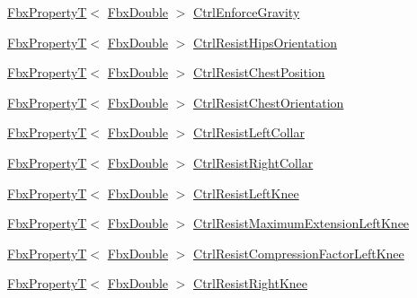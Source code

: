 \begin{DoxyCompactItemize}
\item 
\hyperlink{class_fbx_property_t}{Fbx\+PropertyT}$<$ \hyperlink{fbxtypes_8h_a171e72a1c46fc15c1a6c9c31948c1c5b}{Fbx\+Double} $>$ \hyperlink{class_fbx_character_a45dd614ee3bd42e3324a76f627cd991e}{Ctrl\+Enforce\+Gravity}
\item 
\hyperlink{class_fbx_property_t}{Fbx\+PropertyT}$<$ \hyperlink{fbxtypes_8h_a171e72a1c46fc15c1a6c9c31948c1c5b}{Fbx\+Double} $>$ \hyperlink{class_fbx_character_ae947bede68ae4923aef77c4abe90d30e}{Ctrl\+Resist\+Hips\+Orientation}
\item 
\hyperlink{class_fbx_property_t}{Fbx\+PropertyT}$<$ \hyperlink{fbxtypes_8h_a171e72a1c46fc15c1a6c9c31948c1c5b}{Fbx\+Double} $>$ \hyperlink{class_fbx_character_a6c50588335a593f5b77c3171b716a239}{Ctrl\+Resist\+Chest\+Position}
\item 
\hyperlink{class_fbx_property_t}{Fbx\+PropertyT}$<$ \hyperlink{fbxtypes_8h_a171e72a1c46fc15c1a6c9c31948c1c5b}{Fbx\+Double} $>$ \hyperlink{class_fbx_character_a467f01674d5535cd0de9498171007a9d}{Ctrl\+Resist\+Chest\+Orientation}
\item 
\hyperlink{class_fbx_property_t}{Fbx\+PropertyT}$<$ \hyperlink{fbxtypes_8h_a171e72a1c46fc15c1a6c9c31948c1c5b}{Fbx\+Double} $>$ \hyperlink{class_fbx_character_a1fb34d9229828d20770e3cc633bb1c55}{Ctrl\+Resist\+Left\+Collar}
\item 
\hyperlink{class_fbx_property_t}{Fbx\+PropertyT}$<$ \hyperlink{fbxtypes_8h_a171e72a1c46fc15c1a6c9c31948c1c5b}{Fbx\+Double} $>$ \hyperlink{class_fbx_character_a2b946a7f3b93a64587869ef4e3de0010}{Ctrl\+Resist\+Right\+Collar}
\item 
\hyperlink{class_fbx_property_t}{Fbx\+PropertyT}$<$ \hyperlink{fbxtypes_8h_a171e72a1c46fc15c1a6c9c31948c1c5b}{Fbx\+Double} $>$ \hyperlink{class_fbx_character_afc99c4b02f770e151d137bbba9072a66}{Ctrl\+Resist\+Left\+Knee}
\item 
\hyperlink{class_fbx_property_t}{Fbx\+PropertyT}$<$ \hyperlink{fbxtypes_8h_a171e72a1c46fc15c1a6c9c31948c1c5b}{Fbx\+Double} $>$ \hyperlink{class_fbx_character_a4710a35401fed9aebd6ae900abf4d761}{Ctrl\+Resist\+Maximum\+Extension\+Left\+Knee}
\item 
\hyperlink{class_fbx_property_t}{Fbx\+PropertyT}$<$ \hyperlink{fbxtypes_8h_a171e72a1c46fc15c1a6c9c31948c1c5b}{Fbx\+Double} $>$ \hyperlink{class_fbx_character_aa286de94f00e9324a087051e5619c294}{Ctrl\+Resist\+Compression\+Factor\+Left\+Knee}
\item 
\hyperlink{class_fbx_property_t}{Fbx\+PropertyT}$<$ \hyperlink{fbxtypes_8h_a171e72a1c46fc15c1a6c9c31948c1c5b}{Fbx\+Double} $>$ \hyperlink{class_fbx_character_a6dcc989f37036f3a5cb7d972c3bb1b68}{Ctrl\+Resist\+Right\+Knee}

\end{DoxyCompactItemize}
